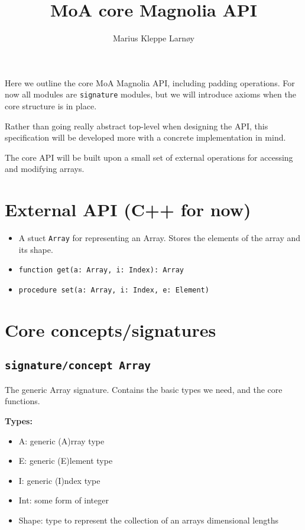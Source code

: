 \documentclass{article}
\author{Marius Kleppe Larnøy}
\begin{document}
\usepackage{tikz}


\title{MoA core Magnolia API}
\maketitle

\noindent Here we outline the core MoA Magnolia API, including padding operations. For now all modules are \texttt{signature} modules, but we will introduce axioms when the core structure is in place.

\noindent Rather than going really abstract top-level when designing the API, this specification will be developed more with a concrete implementation in mind.

\noindent The core API will be built upon a small set of external operations for accessing and modifying arrays.

\section{External API (C++ for now)}
\begin{itemize}
    \item A stuct \texttt{Array} for representing an Array. Stores the elements of the array and its shape.
    \item \texttt{function get(a: Array, i: Index): Array}
    \item \texttt{procedure set(a: Array, i: Index, e: Element)}
\end{itemize}

\section{Core concepts/signatures}

\subsection{\texttt{signature/concept Array}}
\noindent The generic Array signature. Contains the basic types we need, and the core functions.

\noindent \textbf{Types:}
\begin{itemize}
    \item A: generic (A)rray type
    \item E: generic (E)lement type
    \item I: generic (I)ndex type
    \item Int: some form of integer
    \item Shape: type to represent the collection of an arrays dimensional lengths
\end{itemize}
\end{document}
